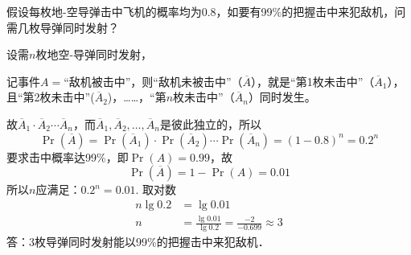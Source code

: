 \begin{example}
   假设每枚地-空导弹击中飞机的概率均为0.8，如要有99\%的把握击中来犯敌机，问需几枚导弹同时发射？ 
\end{example}


\begin{solution}
设需$n$枚地空-导弹同时发射，

记事件$A=$“敌机被击中”，则“敌机未被击中”（$\overline{A}$），就是“第1枚未击中”（$\overline{A}_1$），且“第2枚未击中”($\overline{A}_2$)，……，“第$n$枚未击中”（$\overline{A}_n$）同时发生。

故$\overline{A}_1\cdot \overline{A}_2\cdots \overline{A}_n$，而$\overline{A}_1, \overline{A}_2,\ldots,\overline{A}_n$是彼此独立的，所以
\[\Pr(\overline{A})=\Pr(\overline{A}_1)\cdot \Pr(\overline{A}_2)\cdots\Pr(\overline{A}_n)=(1-0.8)^n=0.2^n\]
要求击中概率达99\%，即$\Pr(A)=0.99$，故
\[\Pr(\overline{A})=1-\Pr(A)=0.01\]
所以$n$应满足：$0.2^n=0.01$. 取对数
\[\begin{split}
    n\lg0.2&=\lg0.01\\
n&=\frac{\lg0.01}{\lg0.2}=\frac{-2}{-0.699}\approx 3
\end{split} \]
答：3枚导弹同时发射能以99\%的把握击中来犯敌机．    
\end{solution}


